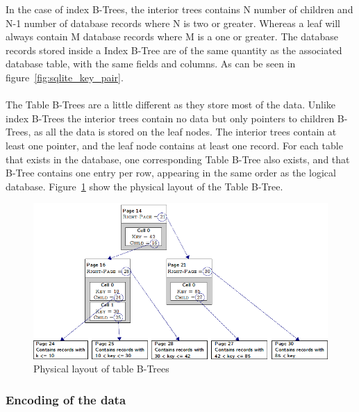 In the case of index B-Trees, the interior trees contains N number of children and N-1 number of database records where N is two or greater. Whereas a leaf will always contain M database records where M is a one or greater. The database records stored inside a Index B-Tree are of the same quantity as the associated database table, with the same fields and columns. As can be seen in figure~\ref{fig:sqlite_key_pair}.
\\\\
The Table B-Trees are a little different as they store most of the data. Unlike index B-Trees the interior trees contain no data but only pointers to children B-Trees, as all the data is stored on the leaf nodes. The interior trees contain at least one pointer, and the leaf node contains at least one record. For each table that exists in the database, one corresponding Table B-Tree also exists, and that B-Tree contains one entry per row, appearing in the same order as the logical database. Figure~\ref{fig:sqlite_table_btree} show the physical layout of the Table B-Tree. 
\begin{figure}[H]
	\centering
	\includegraphics[scale=0.5]{images/sqlite_table_btree.png}
	\caption{Physical layout of table B-Trees \citep{chibd}}
	\label{fig:sqlite_table_btree}
\end{figure}

\subsubsection{Encoding of the data}
\label{subsubsec:sqlite_data_encoding}

